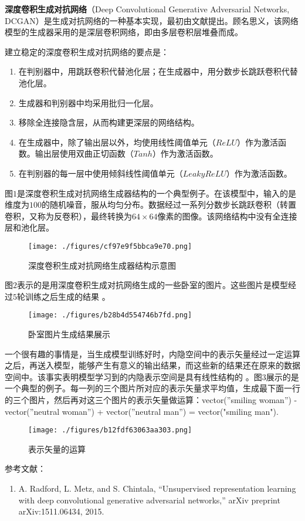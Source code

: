 
\textbf{深度卷积生成对抗网络}（Deep Convolutional Generative Adversarial Networks, DCGAN）是生成对抗网络的一种基本实现，最初由文献\cite{DCGAN}提出。顾名思义，该网络模型的生成器采用的是深层卷积网络，即由多层卷积层堆叠而成。

建立稳定的深度卷积生成对抗网络的要点是\cite{DCGAN}：
\begin{enumerate}
\item 在判别器中，用跳跃卷积代替池化层；在生成器中，用分数步长跳跃卷积代替池化层。
\item 生成器和判别器中均采用批归一化层。
\item 移除全连接隐含层，从而构建更深层的网络结构。
\item 在生成器中，除了输出层以外，均使用线性阈值单元（$ReLU$）作为激活函数。输出层使用双曲正切函数（$Tanh$）作为激活函数。
\item 在判别器的每一层中使用倾斜线性阈值单元（$Leaky ReLU$）作为激活函数。
\end{enumerate}

图$1$是深度卷积生成对抗网络生成器结构的一个典型例子。在该模型中，输入的是维度为$100$的随机噪音，服从均匀分布。数据经过一系列分数步长跳跃卷积（转置卷积，又称为反卷积），最终转换为$64 \times64$像素的图像。该网络结构中没有全连接层和池化层。
\begin{figure}[ht]
\centering
\texttt{[image: ./figures/cf97e9f5bbca9e70.png]}
\caption{深度卷积生成对抗网络生成器结构示意图 \cite{DCGAN}} \label{fig_DCGAN_1}
\end{figure}

图$2$表示的是用深度卷积生成对抗网络生成的一些卧室的图片。这些图片是模型经过$5$轮训练之后生成的结果 \cite{DCGAN}。
\begin{figure}[ht]
\centering
\texttt{[image: ./figures/b28b4d554746b7fd.png]}
\caption{卧室图片生成结果展示} \label{fig_DCGAN_2}
\end{figure}

一个很有趣的事情是，当生成模型训练好时，内隐空间中的表示矢量经过一定运算之后，再送入模型，能够产生有意义的输出结果，而这些新的结果还在原来的数据空间中。该事实表明模型学习到的内隐表示空间是具有线性结构的 \cite{DCGAN}。图$3$展示的是一个典型的例子。每一列的三个图片所对应的表示矢量求平均值，生成最下面一行的三个图片，然后再对这三个图片的表示矢量做运算：vector(”smiling woman”) - vector(”neutral woman”) + vector(”neutral man”) = vector("smiling man").

\begin{figure}[ht]
\centering
\texttt{[image: ./figures/b12fdf63063aa303.png]}
\caption{表示矢量的运算} \label{fig_DCGAN_3}
\end{figure}




参考文献：
\begin{enumerate}
\item A. Radford, L. Metz, and S. Chintala, “Unsupervised representation learning with deep convolutional generative adversarial networks,” arXiv preprint arXiv:1511.06434, 2015.
\end{enumerate}